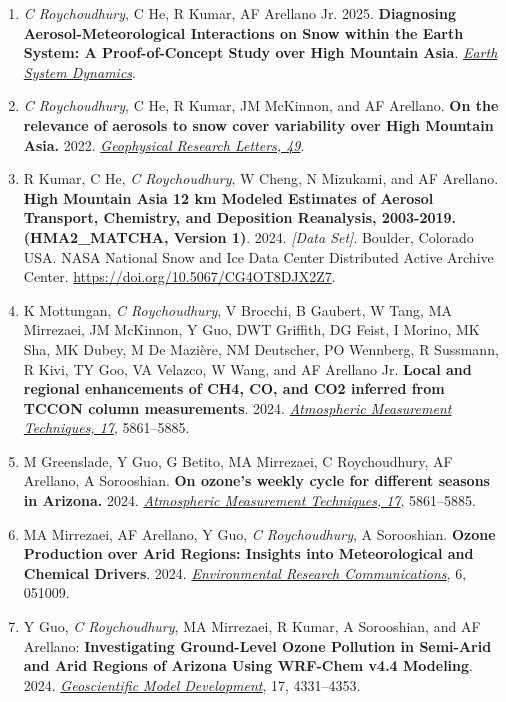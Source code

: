 \documentclass[margin,line]{resume}
\begin{document}
\begin{resume}
\begin{enumerate}[topsep=1pt, partopsep=1pt, itemsep=0.5pt, parsep=0.1pt, leftmargin=15pt,label=\arabic*.]
			\item \textit{C Roychoudhury}, C He, R Kumar, AF Arellano Jr. 2025.  \textbf{Diagnosing Aerosol-Meteorological Interactions on Snow within the Earth System: A Proof-of-Concept Study over High Mountain Asia}.  \emph{\href{16, 1237–1266, https://doi.org/10.5194/esd-16-1237-2025, 2025.}{Earth System Dynamics}}.
			
			\item \textit{C Roychoudhury}, C He, R Kumar, JM McKinnon, and AF Arellano. \textbf{On the relevance of aerosols to snow cover variability over High Mountain Asia.} 2022.  \href{https://doi.org/10.1029/2022GL099317}{\textit{Geophysical Research Letters, 49}}.
			
			\item R Kumar, C He, \textit{C Roychoudhury}, W Cheng, N Mizukami, and AF Arellano. 
			 \textbf{High Mountain Asia 12 km Modeled Estimates of Aerosol Transport, Chemistry, and Deposition Reanalysis, 2003-2019. (HMA2\_MATCHA, Version 1)}. 2024. \textit{[Data Set]}. Boulder, Colorado USA. NASA National Snow and Ice Data Center Distributed Active Archive Center. \url{https://doi.org/10.5067/CG4OT8DJX2Z7}.
			
			\item K Mottungan, \textit{C Roychoudhury}, V Brocchi, B Gaubert, W Tang, MA Mirrezaei, JM McKinnon, Y Guo, DWT Griffith, DG Feist, I Morino, MK Sha, MK Dubey, M De Mazière, NM Deutscher, PO Wennberg, R Sussmann, R Kivi, TY Goo, VA Velazco, W Wang, and AF Arellano Jr. \textbf{Local and regional enhancements of CH4, CO, and CO2 inferred from TCCON column measurements}. 2024.  \href{https://doi.org/10.5194/amt-17-5861-2024}{\textit{Atmospheric Measurement Techniques, 17}}, 5861–5885.
			
			\item M Greenslade, Y Guo, G Betito, MA Mirrezaei, C Roychoudhury, AF Arellano, A Sorooshian. \textbf{On ozone's weekly cycle for different seasons in Arizona.} 2024. \href{https://doi.org/10.5194/amt-17-5861-2024}{\textit{Atmospheric Measurement Techniques, 17}}, 5861–5885.
			
			\item MA Mirrezaei, AF Arellano, Y Guo, \textit{C Roychoudhury}, A Sorooshian. \textbf{Ozone Production over Arid Regions: Insights into Meteorological and
				Chemical Drivers}. 2024.  \href{https://10.1088/2515-7620/ad484c}{\textit{Environmental Research Communications}}, 6, 051009.
			
				\item Y Guo, \textit{C Roychoudhury}, MA Mirrezaei, R Kumar, A Sorooshian, and AF Arellano: \textbf{Investigating Ground-Level Ozone Pollution in Semi-Arid and Arid Regions of Arizona Using WRF-Chem v4.4 Modeling}. 2024.
			\href{ https://doi.org/10.5194/gmd-17-4331-2024}{\textit{Geoscientific Model Development}},  17, 4331–4353.
			

\end{enumerate}
\end{resume}
\end{document}
